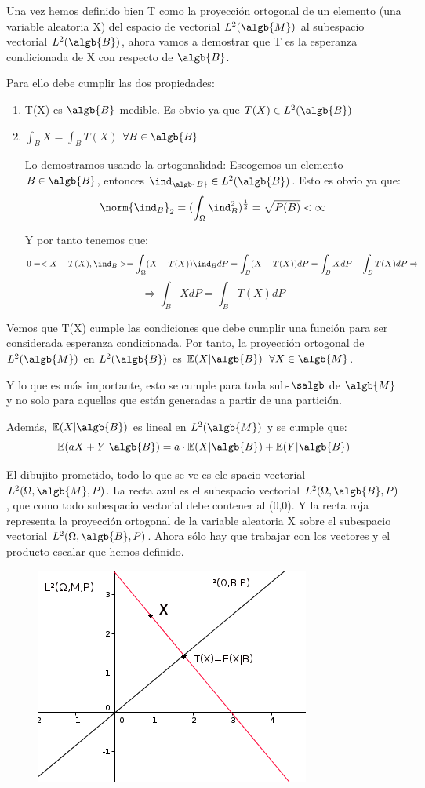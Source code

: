 \documentclass{apuntes}
\begin{document}
Una vez hemos definido bien T como la proyección ortogonal de un elemento (una variable aleatoria X) del espacio de vectorial $L^2(\algb{M})$ al subespacio vectorial $L^2(\algb{B})$, ahora vamos a demostrar que T es la esperanza condicionada de X con respecto de $\algb{B}$.

Para ello debe cumplir las dos propiedades:
\begin{enumerate}
\item T(X) es $\algb{B}$-medible. Es obvio ya que $T(X) \in L^2(\algb{B})$

\item $\int_B X =\int_B T(X)$  $\forall B \in \algb{B}$

Lo demostramos usando la ortogonalidad: Escogemos un elemento $B \in \algb{B}$, entonces $\ind_{\algb{B}} \in L^2(\algb{B})$. Esto es obvio ya que:
\[
\norm{\ind_B}_2=(\int_{\Omega}\ind_B^2)^{\frac{1}{2}}=\sqrt{P(B)}<\infty
\]

Y por tanto tenemos que:
\[
0=<X-T(X),\ind_B> = \int_{\Omega}(X-T(X))\ind_B dP= \int_B(X-T(X)) dP= \int_B X dP - \int_B T(X) dP \Rightarrow
\]
\[
\Rightarrow \int_B X dP = \int_B T(X) dP
\]
\end{enumerate}

Vemos que T(X) cumple las condiciones que debe cumplir una función para ser considerada esperanza condicionada. Por tanto, la proyección ortogonal de $L^2(\algb{M})$ en $L^2(\algb{B})$ es $\mathbb{E}(X|\algb{B})$ $\forall X \in \algb{M}$.

Y lo que es más importante, esto se cumple para toda sub-$\salgb$ de $\algb{M}$ y no solo para aquellas que están generadas a partir de una partición.

Además, $\mathbb{E}(X|\algb{B})$ es lineal en $L^2(\algb{M})$ y se cumple que:
\[
\mathbb{E}(aX+Y|\algb{B})=a\cdot\mathbb{E}(X|\algb{B})+\mathbb{E}(Y|\algb{B})
\]

El dibujito prometido, todo lo que se ve es ele spacio vectorial $L^2(\Omega,\algb{M},P)$. La recta azul es el subespacio vectorial $L^2(\Omega,\algb{B},P)$, que como todo subespacio vectorial debe contener al (0,0). Y la recta roja representa la proyección ortogonal de la variable aleatoria X sobre el subespacio vectorial $L^2(\Omega,\algb{B},P)$. Ahora sólo hay que trabajar con los vectores y el producto escalar que hemos definido.
\begin{figure}[h]
\centering
\includegraphics[page=1,scale=0.745]{img/graf1.png}
\end{figure}
\end{document}
